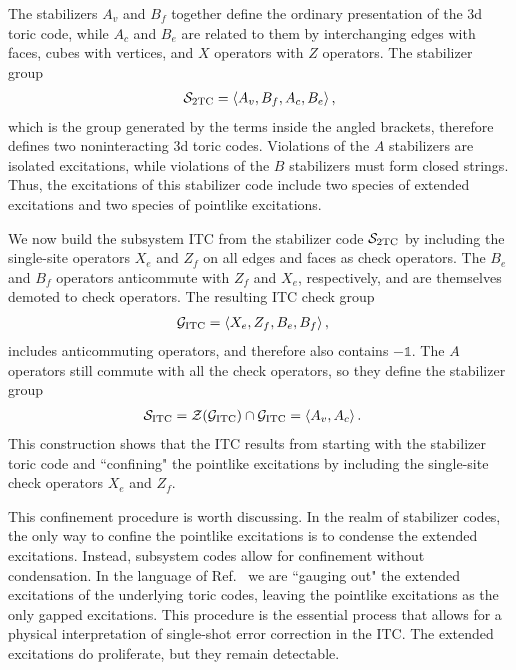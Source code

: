 The stabilizers $A_v$ and $B_f$ together define the ordinary presentation of the 3d toric code, while $A_c$ and $B_e$ are related to them by interchanging edges with faces, cubes with vertices, and $X$ operators with $Z$ operators.
The stabilizer group
\begin{align}
\S_\text{2TC} = \left \langle A_v, B_f, A_c, B_e \right \rangle, \label{eqn:S-2TC}
\end{align}
which is the group generated by the terms inside the angled brackets, therefore defines two noninteracting 3d toric codes.
Violations of the $A$ stabilizers are isolated excitations, while violations of the $B$ stabilizers must form closed strings.
Thus, the excitations of this stabilizer code include two species of extended excitations and two species of pointlike excitations.

We now build the subsystem ITC from the stabilizer code $\S_\TTC$ by including the single-site operators $X_e$ and $Z_f$ on all edges and faces as check operators. The $B_e$ and $B_f$ operators anticommute with $Z_f$ and $X_e$, respectively, and are themselves demoted to check operators. The resulting ITC check group
\begin{align}
\cal{G}_\ITC &= \left \langle X_e, Z_f, B_e, B_f \right \rangle, \label{eqn:checks-toric}
\end{align}
includes anticommuting operators, and therefore also contains $-\mathds{1}$. The $A$ operators still commute with all the check operators, so they define the stabilizer group
\begin{align}
\cal{S}_\ITC &= \Z(\cal{G}_\ITC) \cap \G_\ITC = \left \langle A_v, A_c \right\rangle. \label{eqn:stabilizers}
\end{align}
This construction shows that the ITC results from starting with the stabilizer toric code and ``confining" the pointlike excitations by including the single-site check operators $X_e$ and $Z_f$. 

This confinement procedure is worth discussing. In the realm of stabilizer codes, the only way to confine the pointlike excitations is to condense the extended excitations. Instead, subsystem codes allow for confinement without condensation. In the language of Ref.~\cite{Ellison2022Subsystem} we are ``gauging out" the extended excitations of the underlying toric codes, leaving the pointlike excitations as the only gapped excitations. This procedure is the essential process that allows for a physical interpretation of single-shot error correction in the ITC. The extended excitations do proliferate, but they remain detectable.

